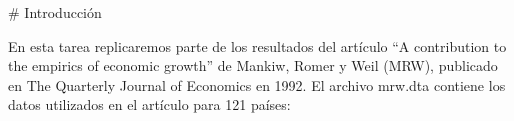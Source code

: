 # Introducción

En esta tarea replicaremos parte de los resultados del artículo “A contribution to the empirics of economic growth” de Mankiw, Romer y Weil (MRW), publicado en The Quarterly Journal of Economics en 1992. El archivo mrw.dta contiene los datos utilizados en el artículo para 121  países:

